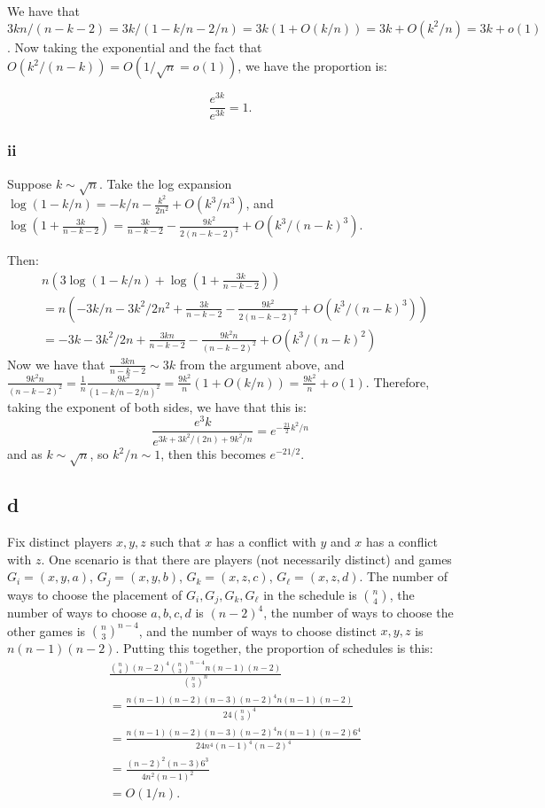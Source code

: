 \documentclass[]{article}
\theoremstyle{definition}
\numberwithin{theorem}{section}
\numberwithin{equation}{section}
\begin{document}
We have that $3kn/(n - k - 2) = 3k/(1 - k/n - 2/n) = 3k(1 + O(k/n)) = 3k + O(k^2/n) =  3k + o(1)$. 
Now taking the exponential and the fact that $O(k^2/(n - k)) = O(1/\sqrt{n} = o(1))$, we have the proportion is:

\begin{equation}
	\frac{e^{3k}}{e^{3k}} = 1. 
\end{equation}

\subsubsection{ii}
Suppose $k \sim \sqrt{n}$. 
Take the log expansion 
$\log(1 - k/n)  = -k/n - \frac{k^2}{2n^2} + O(k^3/n^3)$, and $\log\left(1 + \frac{3k}{n - k - 2}\right) = \frac{3k}{n - k - 2} - \frac{9k^2}{2(n - k - 2)^2} + O(k^3/(n - k)^3)$. 

Then:
\begin{align*}
	&n \left( 3 \log(1 - k/n) + \log\left(1 + \frac{3k}{n - k - 2}\right)\right) \\
	&= n \left(-3k/n - 3k^2/2n^2 + \frac{3k}{n - k - 2} - \frac{9k^2}{2(n - k - 2)^2} + O(k^3/(n - k)^3)\right)\\
	&= -3k - 3k^2/2n + \frac{3kn}{n - k - 2} - \frac{9k^2 n}{(n - k - 2)^2} + O(k^3/(n - k)^2)
\end{align*}
Now we have that $\frac{3kn}{n - k - 2}  \sim 3k$ from the argument above, and $\frac{9k^2 n}{(n - k - 2)^2} = \frac{1}{n} \frac{9 k^2}{(1 - k/n - 2/n)^2} = \frac{9k^2}{n}(1 + O(k/n)) = \frac{9k^2}{n} + o(1)$. Therefore, taking the exponent of both sides, we have that this is:
\begin{equation}
	\frac{e^3k }{e^{3k + 3k^2/(2n) + 9k^2/n}} = e^{-\frac{21}{2} k^2/n}
\end{equation}
and as $k \sim \sqrt{n}$, so $k^2/n \sim 1$, then this becomes $e^{-21/2}$. 

\subsection{d}
Fix distinct players $x, y, z$ such that $x$ has a conflict with $y$ and $x$ has a conflict with $z$. One scenario is that there are players (not necessarily distinct) and games $G_i = (x, y, a)$, $G_j = (x, y, b)$, $G_k = (x, z, c)$, $G_\ell = (x, z, d)$. 
The number of ways to choose the placement of $G_i, G_j, G_k, G_\ell$ in the schedule is $\binom{n}{4}$, the number of ways to choose $a, b, c, d$ is $(n - 2)^4$, the number of ways to choose the other games is $\binom{n}{3}^{n - 4}$, and the number of ways to choose distinct $x, y, z$ is $n(n - 1)(n-2)$. Putting this together, the proportion of schedules is this:
\begin{align*}
	&\frac{\binom{n}{4} (n-2)^4 \binom{n}{3}^{n - 4} n (n-1)(n-2)}{\binom{n}{3}^n}\\
	&= \frac{n(n-1)(n-2)(n-3) (n-2)^4 n (n-1)(n-2)}{24 \binom{n}{3}^4}\\
	&= \frac{n(n-1)(n-2)(n-3) (n-2)^4 n (n-1)(n-2) 6^4 }{24 n^4 (n-1)^4 (n-2)^4}\\
	&= \frac{(n - 2)^2 (n - 3) 6^3}{4 n^2 (n-1)^2}\\
	&= O(1/n).
\end{align*}
\end{document}
